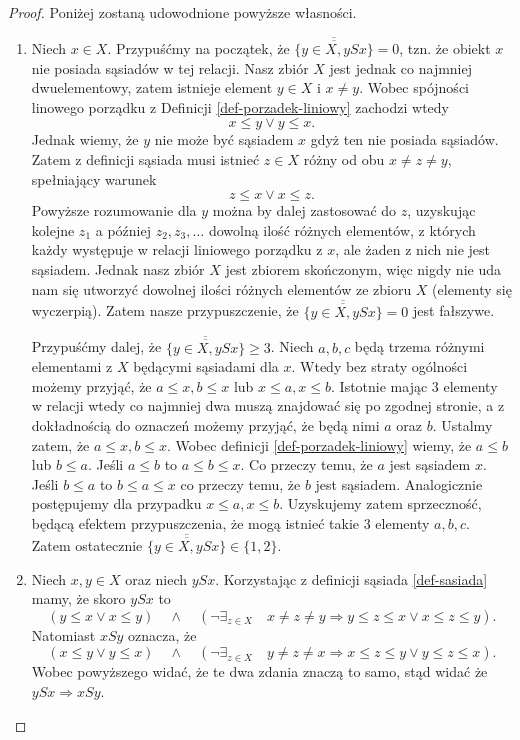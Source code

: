 \documentclass[12pt,a4paper]{report}
\newcommand{\licznosc}[1]{\overline{\overline{#1}}}
\begin{document}
\begin{proof}
Poniżej zostaną udowodnione powyższe własności.
\begin{enumerate}
\item Niech $x \in X$. Przypuśćmy na początek, że $\licznosc{\{y \in X, ySx\}} = 0$, tzn. że obiekt $x$ nie posiada sąsiadów w tej relacji. Nasz zbiór $X$ jest jednak co najmniej dwuelementowy, zatem istnieje element $y \in X$ i $ x \neq y$. Wobec spójności linowego porządku z Definicji \ref{def-porzadek-liniowy} zachodzi wtedy
$$ x \leq y \lor y \leq x.$$
Jednak wiemy, że $y$ nie może być sąsiadem $x$ gdyż ten nie posiada sąsiadów. Zatem z definicji sąsiada musi istnieć $z \in X$ różny od obu $x \neq z \neq y$, spełniający warunek
$$
z \leq x \lor x \leq z.
$$
Powyższe rozumowanie dla $y$ można by dalej zastosować do $z$, uzyskując kolejne $z_1$ a później $z_2,z_3, \ldots$ dowolną ilość różnych elementów, z których każdy występuje w relacji liniowego porządku z $x$, ale żaden z nich nie jest sąsiadem. Jednak nasz zbiór $X$ jest zbiorem skończonym, więc nigdy nie uda nam się utworzyć dowolnej ilości różnych elementów ze zbioru $X$ (elementy się wyczerpią). Zatem nasze przypuszczenie, że $\licznosc{\{y \in X, ySx\}} = 0$ jest fałszywe.

Przypuśćmy dalej, że $\licznosc{\{y \in X, ySx\}} \geq 3$. Niech $a,b,c$ będą trzema różnymi elementami z $X$ będącymi sąsiadami dla $x$. Wtedy bez straty ogólności możemy przyjąć, że $a \leq x, b \leq x$ lub $x \leq a, x \leq b$. Istotnie mając 3 elementy w relacji wtedy co najmniej dwa muszą znajdować się po zgodnej stronie, a z dokładnością do oznaczeń możemy przyjąć, że będą nimi $a$ oraz $b$. Ustalmy zatem, że $a \leq x, b \leq x$. Wobec definicji \ref{def-porzadek-liniowy} wiemy, że $a \leq b$ lub $b \leq a$. Jeśli $a \leq b$ to $a \leq b \leq x$. Co przeczy temu, że $a$ jest sąsiadem $x$. Jeśli $b \leq a$ to $b \leq a \leq x$ co przeczy temu, że $b$ jest sąsiadem. Analogicznie postępujemy dla przypadku $x \leq a, x \leq b$. Uzyskujemy zatem sprzeczność, będącą efektem przypuszczenia, że mogą istnieć takie 3 elementy $a,b,c$. Zatem ostatecznie $\licznosc{\{y \in X, ySx\}} \in \{ 1,2 \}$.

\item Niech $x,y \in X$ oraz niech $ySx$. Korzystając z definicji sąsiada \ref{def-sasiada} mamy, że skoro $ySx$ to  $$\left(y \leq x \lor x\leq y \right)\quad \land \quad  \left(\lnot \exists_{z \in X}  \quad x\neq z \neq y \Rightarrow   y \leq z \leq x \lor x \leq z \leq y \right).$$ 
Natomiast $xSy$ oznacza, że 
$$\left(x \leq y \lor y\leq x \right)\quad \land \quad  \left(\lnot \exists_{z \in X}  \quad y\neq z \neq x \Rightarrow   x \leq z \leq y \lor y \leq z \leq x \right).$$ 
Wobec powyższego widać, że te dwa zdania znaczą to samo, stąd widać że  $ySx \Rightarrow xSy$. %


\end{enumerate}
\end{proof}
\end{document}
